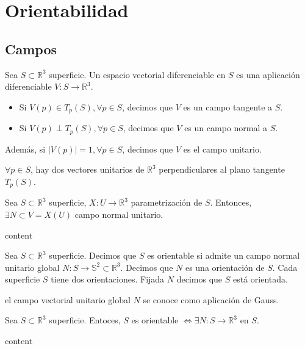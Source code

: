 \chapter{Orientabilidad}

\section{Campos}

\begin{defn}[Campo]
  Sea $S \subset \mathbb{R}^{3}$ superficie. Un espacio vectorial diferenciable en $S$ es una aplicación diferenciable $V : S \to \mathbb{R}^{3}$. 
  \begin{itemize}
    \item Si $V(p) \in T_{p}(S), \forall p \in S$, decimos que $V$ es un campo tangente a $S$.
    \item Si $V(p) \perp T_{p}(S), \forall p \in S$, decimos que $V$ es un campo normal a $S$. 
  \end{itemize}
  Además, si $| V(p) | = 1, \forall p \in S$, decimos que $V$ es el campo unitario.
\end{defn}

\begin{obs}
  $\forall p \in S$, hay dos vectores unitarios de $\mathbb{R}^{3}$ perpendiculares al plano tangente $T_{p}(S)$.
\end{obs}

\begin{prop}
  Sea $S \subset \mathbb{R}^{3}$ superficie, $X : U \to \mathbb{R}^{3}$ parametrización de $S$. Entonces, $\exists N \subset V = X(U)$ campo normal unitario.
\end{prop}

\begin{dem}
  content
\end{dem}

\begin{defn}
  Sea $S \subset \mathbb{R}^{3}$ superficie. Decimos que $S$ es orientable si admite un campo normal unitario global $N : S \to \mathbb{S}^{2} \subset \mathbb{R}^{3}$. Decimos que $N$ es una orientación de $S$. Cada superficie $S$ tiene dos orientaciones. Fijada $N$ decimos que $S$ está orientada.
\end{defn}

\begin{obs}
  el campo vectorial unitario global $N$ se conoce como aplicación de Gauss.
\end{obs}

\begin{prop}
  Sea $S \subset \mathbb{R}^{3}$ superficie. Entoces, $S$ es orientable $\Leftrightarrow \exists N : S \to \mathbb{R}^{3}$ en $S$.
\end{prop}

\begin{dem}
  content
\end{dem}
